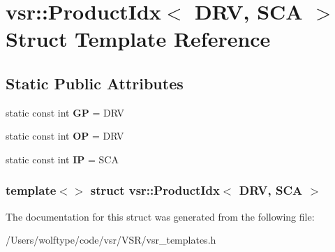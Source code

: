 \hypertarget{structvsr_1_1_product_idx_3_01_d_r_v_00_01_s_c_a_01_4}{\section{vsr\-:\-:Product\-Idx$<$ D\-R\-V, S\-C\-A $>$ Struct Template Reference}
\label{structvsr_1_1_product_idx_3_01_d_r_v_00_01_s_c_a_01_4}
}
\subsection*{Static Public Attributes}
\begin{DoxyCompactItemize}
\item 
\hypertarget{structvsr_1_1_product_idx_3_01_d_r_v_00_01_s_c_a_01_4_a91bae1e1ea0dc18522f7df3a03ce7ab4}{static const int {\bfseries G\-P} = D\-R\-V}\label{structvsr_1_1_product_idx_3_01_d_r_v_00_01_s_c_a_01_4_a91bae1e1ea0dc18522f7df3a03ce7ab4}

\item 
\hypertarget{structvsr_1_1_product_idx_3_01_d_r_v_00_01_s_c_a_01_4_a3de84a23960be981a3683d3816a006dd}{static const int {\bfseries O\-P} = D\-R\-V}\label{structvsr_1_1_product_idx_3_01_d_r_v_00_01_s_c_a_01_4_a3de84a23960be981a3683d3816a006dd}

\item 
\hypertarget{structvsr_1_1_product_idx_3_01_d_r_v_00_01_s_c_a_01_4_acd85879d885ef8b73a128f27e578efb7}{static const int {\bfseries I\-P} = S\-C\-A}\label{structvsr_1_1_product_idx_3_01_d_r_v_00_01_s_c_a_01_4_acd85879d885ef8b73a128f27e578efb7}

\end{DoxyCompactItemize}
\subsubsection*{template$<$$>$ struct vsr\-::\-Product\-Idx$<$ D\-R\-V, S\-C\-A $>$}



The documentation for this struct was generated from the following file\-:\begin{DoxyCompactItemize}
\item 
/\-Users/wolftype/code/vsr/\-V\-S\-R/vsr\-\_\-templates.\-h\end{DoxyCompactItemize}
